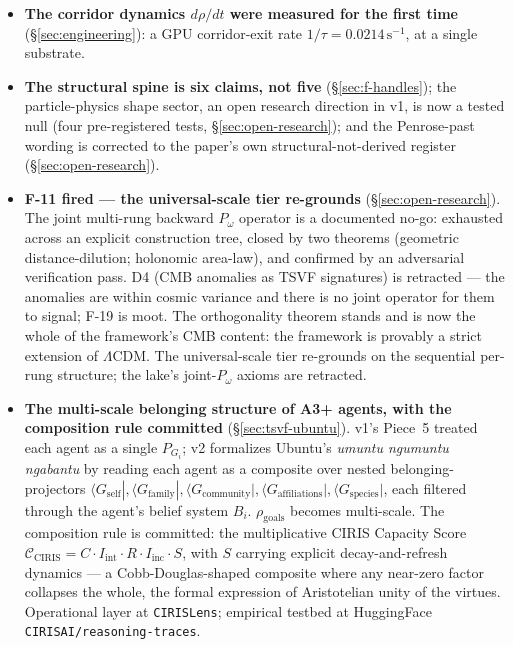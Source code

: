 \documentclass[11pt,a4paper]{article}
\newcommand{\Pomega}{P_{\omega}}
\begin{document}
\begin{itemize}[leftmargin=*,itemsep=0.5em]
\item \textbf{The corridor dynamics $d\rho/dt$ were measured for the first time} (\S\ref{sec:engineering}): a GPU corridor-exit rate $1/\tau = 0.0214\,\mathrm{s}^{-1}$, at a single substrate.
\item \textbf{The structural spine is six claims, not five} (\S\ref{sec:f-handles}); the particle-physics shape sector, an open research direction in v1, is now a tested null (four pre-registered tests, \S\ref{sec:open-research}); and the Penrose-past wording is corrected to the paper's own structural-not-derived register (\S\ref{sec:open-research}).
\item \textbf{F-11 fired --- the universal-scale tier re-grounds} (\S\ref{sec:open-research}). The joint multi-rung backward $\Pomega$ operator is a documented no-go: exhausted across an explicit construction tree, closed by two theorems (geometric distance-dilution; holonomic area-law), and confirmed by an adversarial verification pass. D4 (CMB anomalies as TSVF signatures) is retracted --- the anomalies are within cosmic variance and there is no joint operator for them to signal; F-19 is moot. The orthogonality theorem stands and is now the whole of the framework's CMB content: the framework is provably a strict extension of $\Lambda$CDM. The universal-scale tier re-grounds on the sequential per-rung structure; the lake's joint-$\Pomega$ axioms are retracted.
\item \textbf{The multi-scale belonging structure of A3+ agents, with the composition rule committed} (\S\ref{sec:tsvf-ubuntu}). v1's Piece~5 treated each agent as a single $P_{G_i}$; v2 formalizes Ubuntu's \emph{umuntu ngumuntu ngabantu} by reading each agent as a composite over nested belonging-projectors $\langle G_{\text{self}}|, \langle G_{\text{family}}|, \langle G_{\text{community}}|, \langle G_{\text{affiliations}}|, \langle G_{\text{species}}|$, each filtered through the agent's belief system $B_i$. $\rho_{\text{goals}}$ becomes multi-scale. The composition rule is committed: the multiplicative CIRIS Capacity Score $\mathcal{C}_{\text{CIRIS}} = C \cdot I_{\text{int}} \cdot R \cdot I_{\text{inc}} \cdot S$, with $S$ carrying explicit decay-and-refresh dynamics --- a Cobb-Douglas-shaped composite where any near-zero factor collapses the whole, the formal expression of Aristotelian unity of the virtues. Operational layer at \texttt{CIRISLens}; empirical testbed at HuggingFace \texttt{CIRISAI/reasoning-traces}.
\end{itemize}
\end{document}
